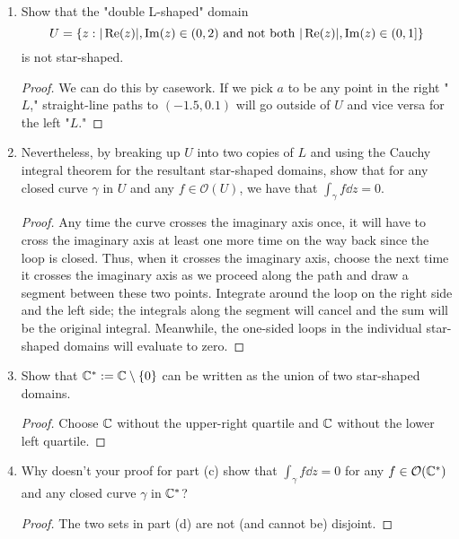 \documentclass[../psets.tex]{subfiles}
\begin{document}
\begin{enumerate}[label={\textbf{\arabic*.}}]
\begin{enumerate}
\begin{proof}
\begin{center}
            \end{center}
        \end{proof}
        \item Show that the "double L-shaped" domain
        \begin{equation*}
            U = \{z:|\operatorname{Re}(z)|,\operatorname{Im}(z)\in(0,2)\text{ and not both }|\operatorname{Re}(z)|,\operatorname{Im}(z)\in(0,1]\}
        \end{equation*}
        is not star-shaped.
        \begin{proof}
            We can do this by casework. If we pick $a$ to be any point in the right "$L$," straight-line paths to $(-1.5,0.1)$ will go outside of $U$ and vice versa for the left "$L$."
        \end{proof}
        \item Nevertheless, by breaking up $U$ into two copies of $L$ and using the Cauchy integral theorem for the resultant star-shaped domains, show that for any closed curve $\gamma$ in $U$ and any $f\in\mathcal{O}(U)$, we have that $\int_\gamma f\dd{z}=0$.
        \begin{proof}
            Any time the curve crosses the imaginary axis once, it will have to cross the imaginary axis at least one more time on the way back since the loop is closed. Thus, when it crosses the imaginary axis, choose the next time it crosses the imaginary axis as we proceed along the path and draw a segment between these two points. Integrate around the loop on the right side and the left side; the integrals along the segment will cancel and the sum will be the original integral. Meanwhile, the one-sided loops in the individual star-shaped domains will evaluate to zero.
        \end{proof}
        \item Show that $\mathbb{C}^*:=\mathbb{C}\setminus\{0\}$ can be written as the union of two star-shaped domains.
        \begin{proof}
            Choose $\mathbb{C}$ without the upper-right quartile and $\mathbb{C}$ without the lower left quartile.
        \end{proof}
        \item Why doesn't your proof for part (c) show that $\int_\gamma f\dd{z}=0$ for any $f\in\mathcal{O}(\mathbb{C}^*)$ and any closed curve $\gamma$ in $\mathbb{C}^*$?
        \begin{proof}
            The two sets in part (d) are not (and cannot be) disjoint.
        \end{proof}
    \end{enumerate}
\end{enumerate}
\end{document}
